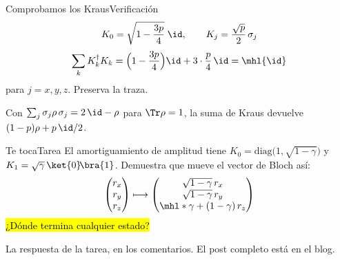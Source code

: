 \documentclass[12pt]{beamer}
\begin{document}
\begin{frame}{Comprobamos los Kraus}{Verificación}
\[
  K_0 = \sqrt{1-\frac{3p}{4}}\;\id ,
  \qquad
  K_j = \frac{\sqrt{p}}{2}\,\sigma_j
\]
\[
  \sum_k K_k^\dagger K_k
  = \Big(1-\frac{3p}{4}\Big)\id + 3\cdot\frac{p}{4}\,\id
  = \mhl{\id}
\]
para $j = x,y,z$. Preserva la traza. \aside{\checkmark}
\begin{notebox}
Con $\sum_j \sigma_j\rho\,\sigma_j = 2\,\id - \rho$ para $\Tr\rho = 1$,
la suma de Kraus devuelve $(1-p)\rho + p\,\id/2$.
\end{notebox}
\end{frame}

\begin{frame}{Te toca}{Tarea}
El amortiguamiento de amplitud tiene
$K_0 = \mathrm{diag}\big(1,\sqrt{1-\gamma}\big)$ y
$K_1 = \sqrt{\gamma}\,\ket{0}\!\bra{1}$. Demuestra que mueve el vector de
Bloch así:
\[
  \begin{pmatrix} r_x \\ r_y \\ r_z \end{pmatrix}
  \longmapsto
  \begin{pmatrix} \sqrt{1-\gamma}\, r_x \\ \sqrt{1-\gamma}\, r_y \\
    \mhl*{\gamma} + (1-\gamma)\, r_z \end{pmatrix}
\]
\hl{¿Dónde termina cualquier estado?}
\end{frame}

  {La respuesta de la tarea, en los comentarios. El post completo está en el blog.}
\end{document}
